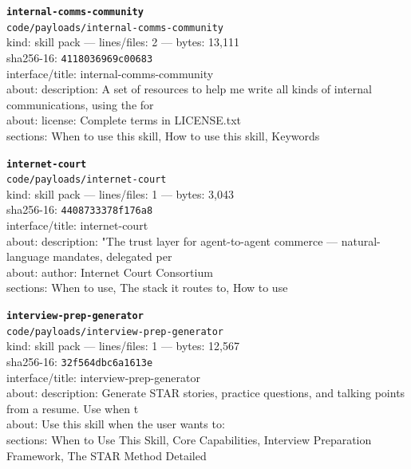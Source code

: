 \noindent\textbf{\texttt{internal-comms-community}}\\
\texttt{code/payloads/internal-comms-community}\\
kind: skill pack --- lines/files: 2 --- bytes: 13,111\\
sha256-16: \texttt{4118036969c00683}\\
interface/title: internal-comms-community\\
about: description: A set of resources to help me write all kinds of internal communications, using the for\\
about: license: Complete terms in LICENSE.txt\\
sections: When to use this skill, How to use this skill, Keywords\\
\vspace*{6.0pt}

\noindent\textbf{\texttt{internet-court}}\\
\texttt{code/payloads/internet-court}\\
kind: skill pack --- lines/files: 1 --- bytes: 3,043\\
sha256-16: \texttt{4408733378f176a8}\\
interface/title: internet-court\\
about: description: "The trust layer for agent-to-agent commerce — natural-language mandates, delegated per\\
about: author: Internet Court Consortium\\
sections: When to use, The stack it routes to, How to use\\
\vspace*{6.0pt}

\noindent\textbf{\texttt{interview-prep-generator}}\\
\texttt{code/payloads/interview-prep-generator}\\
kind: skill pack --- lines/files: 1 --- bytes: 12,567\\
sha256-16: \texttt{32f564dbc6a1613e}\\
interface/title: interview-prep-generator\\
about: description: Generate STAR stories, practice questions, and talking points from a resume. Use when t\\
about: Use this skill when the user wants to:\\
sections: When to Use This Skill, Core Capabilities, Interview Preparation Framework, The STAR Method Detailed\\
\vspace*{6.0pt}
\newpage

